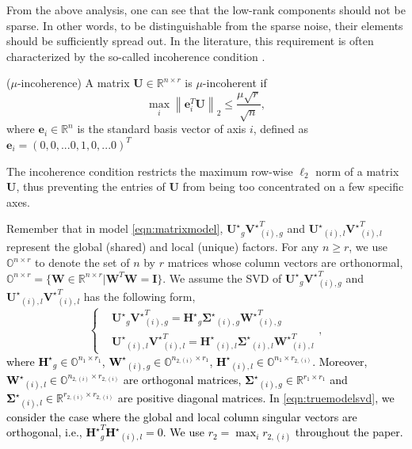 \documentclass[twoside,11pt]{article}
\newcommand{\revise}[1]{\textcolor{black}{ #1}}
\newcommand{\norm}[1]{\left\lVert#1\right\rVert}
\newcommand{\matHst}{{\mathbf{H}^\star}}
\newcommand{\matI}{\mathbf{I}}
\newcommand{\matSigmast}{{\mathbf{\Sigma}^\star}}
\newcommand{\matU}{\mathbf{U}}
\newcommand{\matUst}{{\mathbf{U}^\star}}
\newcommand{\matVst}{{\mathbf{V}^\star}}
\newcommand{\matW}{\mathbf{W}}
\newcommand{\matWst}{{\mathbf{W}^\star}}
\newcommand{\vece}{\mathbf{e}}
\begin{document}
From the above analysis, one can see that the low-rank components should not be sparse. In other words, to be distinguishable from the sparse noise, their elements should be sufficiently spread out. In the literature, this requirement is often characterized by the so-called incoherence condition \citep{robustpca,nonconvexrobustpca}. 


\begin{definition}
\label{ass:incoherence}
($\mu$-incoherence) A matrix $\matU\in \mathbb{R}^{n\times r}$ is $\mu$-incoherent if 
$$
\max_i \norm{\vece_i^T\matU}_2\le \frac{\mu \sqrt{r}}{\sqrt{n}},
$$
where $\vece_i\in\mathbb{R}^n$ is the standard basis vector of axis $i$, defined as $\vece_i=(0,0,...0,1,0,...0)^T$
\end{definition}
The incoherence condition restricts the maximum row-wise $\ell_2$ norm of a matrix $\matU$, thus preventing the entries of $\matU$ from being too concentrated on a few specific axes.

Remember that in model \eqref{eqn:matrixmodel}, $\matUst_{g}\matVst_{(i),g}^T$ and $\matUst_{(i),l}\matVst_{(i),l}^T$ represent the global (shared) and local (unique) factors. For any $n\geq r$, we use $\mathbb{O}^{n\times r}$ to denote the set of $n$ by $r$ matrices whose column vectors are orthonormal, $\mathbb{O}^{n\times r}=\{\matW\in \mathbb{R}^{n\times r}|\matW^T\matW=\matI\}$.  We assume the SVD of
 $\matUst_{g}\matVst_{(i),g}^T$ and $\matUst_{(i),l}\matVst_{(i),l}^T$ has the following form, 
\begin{equation}
\label{eqn:truemodelsvd}
\left\{\begin{aligned}
&\matUst_{g}\matVst_{(i),g}^T =\matHst_g\matSigmast_{(i),g}\matWst_{(i),g}^T\\
&\matUst_{(i),l}\matVst_{(i),l}^T=\matHst_{(i),l}\matSigmast_{(i),l}\matWst_{(i),l}^T
\end{aligned}\right. ,
\end{equation} 
\revise{where $\matHst_g\in \mathbb{O}^{n_1\times r_1}$, $\matWst_{(i),g}\in \mathbb{O}^{n_{2,(i)}\times r_1}$, $\matHst_{(i),l}\in \mathbb{O}^{n_1\times r_{2,(i)}}$. Moreover, $\matWst_{(i),l}\in \mathbb{O}^{n_{2,(i)}\times r_{2,(i)}}$ are orthogonal matrices, $\matSigmast_{(i),g}\in \mathbb{R}^{r_1\times r_1}$ and $\matSigmast_{(i),l}\in \mathbb{R}^{r_{2,(i)}\times r_{2,(i)}}$ are positive diagonal matrices. In \eqref{eqn:truemodelsvd}, we consider the case where the global and local column singular vectors are orthogonal, i.e., $\matHst_g^T\matHst_{(i),l}=0$. We use $r_2=\max_ir_{2,(i)}$ throughout the paper.}
\end{document}
